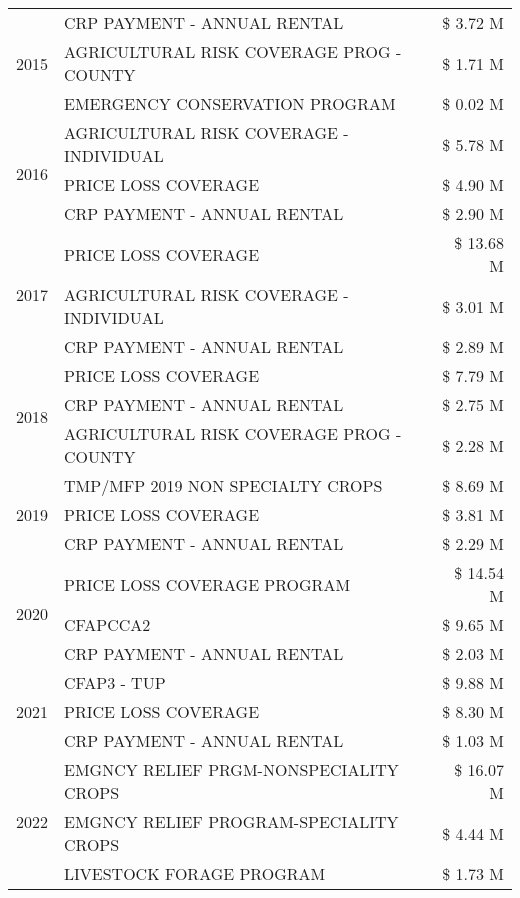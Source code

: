 \begin{tabular}{llr}
\cline{1-3}
\multirow[t]{3}{*}{2015} & CRP PAYMENT - ANNUAL RENTAL & \$ 3.72 M \\
 & AGRICULTURAL RISK COVERAGE PROG - COUNTY & \$ 1.71 M \\
 & EMERGENCY CONSERVATION PROGRAM & \$ 0.02 M \\
\cline{1-3}
\multirow[t]{3}{*}{2016} & AGRICULTURAL RISK COVERAGE - INDIVIDUAL & \$ 5.78 M \\
 & PRICE LOSS COVERAGE & \$ 4.90 M \\
 & CRP PAYMENT - ANNUAL RENTAL & \$ 2.90 M \\
\cline{1-3}
\multirow[t]{3}{*}{2017} & PRICE LOSS COVERAGE & \$ 13.68 M \\
 & AGRICULTURAL RISK COVERAGE - INDIVIDUAL & \$ 3.01 M \\
 & CRP PAYMENT - ANNUAL RENTAL & \$ 2.89 M \\
\cline{1-3}
\multirow[t]{3}{*}{2018} & PRICE LOSS COVERAGE & \$ 7.79 M \\
 & CRP PAYMENT - ANNUAL RENTAL & \$ 2.75 M \\
 & AGRICULTURAL RISK COVERAGE PROG - COUNTY & \$ 2.28 M \\
\cline{1-3}
\multirow[t]{3}{*}{2019} & TMP/MFP 2019 NON SPECIALTY CROPS & \$ 8.69 M \\
 & PRICE LOSS COVERAGE & \$ 3.81 M \\
 & CRP PAYMENT - ANNUAL RENTAL & \$ 2.29 M \\
\cline{1-3}
\multirow[t]{3}{*}{2020} & PRICE LOSS COVERAGE PROGRAM & \$ 14.54 M \\
 & CFAPCCA2 & \$ 9.65 M \\
 & CRP PAYMENT - ANNUAL RENTAL & \$ 2.03 M \\
\cline{1-3}
\multirow[t]{3}{*}{2021} & CFAP3 - TUP & \$ 9.88 M \\
 & PRICE LOSS COVERAGE & \$ 8.30 M \\
 & CRP PAYMENT - ANNUAL RENTAL & \$ 1.03 M \\
\cline{1-3}
\multirow[t]{3}{*}{2022} & EMGNCY RELIEF PRGM-NONSPECIALITY CROPS & \$ 16.07 M \\
 & EMGNCY RELIEF PROGRAM-SPECIALITY CROPS & \$ 4.44 M \\
 & LIVESTOCK FORAGE PROGRAM & \$ 1.73 M \\
\cline{1-3}
\bottomrule
\end{tabular}
